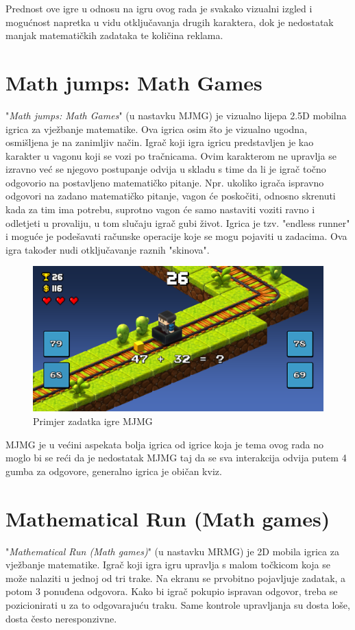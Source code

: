 \documentclass[times, utf8, zavrsni, numeric]{fer}
\begin{document}
	 Prednost ove igre u odnosu na igru ovog rada je svakako vizualni izgled i mogućnost napretka u vidu otključavanja drugih karaktera, dok je nedostatak manjak matematičkih zadataka te količina reklama. 
		

	
	\section{Math jumps: Math Games}
	"\textit{Math jumps: Math Games}" (u nastavku MJMG) je vizualno lijepa 2.5D mobilna igrica za vježbanje matematike. Ova igrica osim što je vizualno ugodna, osmišljena je na zanimljiv način. Igrač koji igra igricu predstavljen je kao karakter
	u vagonu koji se vozi po tračnicama. Ovim karakterom ne upravlja se izravno već se njegovo postupanje odvija u skladu s time da li je igrač točno odgovorio na postavljeno matematičko pitanje. Npr. ukoliko igrača ispravno odgovori na zadano matematičko
	pitanje, vagon će poskočiti, odnosno skrenuti kada za tim ima potrebu, suprotno vagon će samo nastaviti voziti ravno i odletjeti u provaliju, u tom slučaju igrač gubi život. Igrica je tzv. "endless runner" i moguće je podešavati računske operacije
	koje se mogu pojaviti u zadacima. Ova igra također nudi otključavanje raznih "skinova".
	
	\begin{figure}[H]
		\includegraphics[scale = 0.2]{"slike/igre/mathjumps.png"} 
		\centering
		\caption{Primjer zadatka igre MJMG}
		\label{fig:mjmg}
	\end{figure}
	
	MJMG je u većini aspekata bolja igrica od igrice koja je tema ovog rada no moglo bi se reći da je nedostatak MJMG taj da se sva interakcija odvija putem 4 gumba za odgovore, generalno igrica je običan kviz.
	
	
	\section{Mathematical Run (Math games)}
	"\textit{Mathematical Run (Math games)}" (u nastavku MRMG) je 2D mobila igrica za vježbanje matematike. Igrač koji igra igru upravlja s malom točkicom koja se može nalaziti u jednoj od tri trake. Na ekranu se prvobitno pojavljuje zadatak, a potom 3
	ponuđena odgovora. Kako bi igrač pokupio ispravan odgovor, treba se pozicionirati u za to odgovarajuću traku. Same kontrole upravljanja su dosta loše, dosta često neresponzivne.
	
\end{document}
